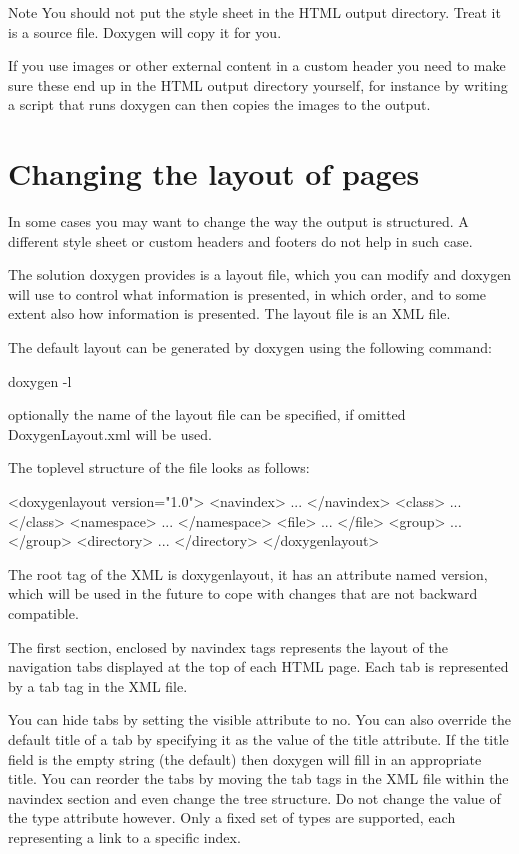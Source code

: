 \begin{DoxyNote}{Note}
You should not put the style sheet in the HTML output directory. Treat it is a source file. Doxygen will copy it for you.

If you use images or other external content in a custom header you need to make sure these end up in the HTML output directory yourself, for instance by writing a script that runs doxygen can then copies the images to the output.
\end{DoxyNote}
\hypertarget{customize_layout}{}\section{Changing the layout of pages}\label{customize_layout}
In some cases you may want to change the way the output is structured. A different style sheet or custom headers and footers do not help in such case.

The solution doxygen provides is a layout file, which you can modify and doxygen will use to control what information is presented, in which order, and to some extent also how information is presented. The layout file is an XML file.

The default layout can be generated by doxygen using the following command: \begin{DoxyVerb}
doxygen -l 
\end{DoxyVerb}
 optionally the name of the layout file can be specified, if omitted {\ttfamily DoxygenLayout.xml} will be used.

The toplevel structure of the file looks as follows: \begin{DoxyVerb}
<doxygenlayout version="1.0">
  <navindex>
    ...
  </navindex>
  <class>
    ...
  </class>
  <namespace>
    ...
  </namespace>
  <file>
    ...
  </file>
  <group>
    ...
  </group>
  <directory>
    ...
  </directory>
</doxygenlayout>
\end{DoxyVerb}


The root tag of the XML is {\ttfamily doxygenlayout}, it has an attribute named {\ttfamily version}, which will be used in the future to cope with changes that are not backward compatible.

The first section, enclosed by {\ttfamily navindex} tags represents the layout of the navigation tabs displayed at the top of each HTML page. Each tab is represented by a {\ttfamily tab} tag in the XML file.

You can hide tabs by setting the {\ttfamily visible} attribute to {\ttfamily no}. You can also override the default title of a tab by specifying it as the value of the {\ttfamily title} attribute. If the title field is the empty string (the default) then doxygen will fill in an appropriate title. You can reorder the tabs by moving the tab tags in the XML file within the {\ttfamily navindex} section and even change the tree structure. Do not change the value of the {\ttfamily type} attribute however. Only a fixed set of types are supported, each representing a link to a specific index.

